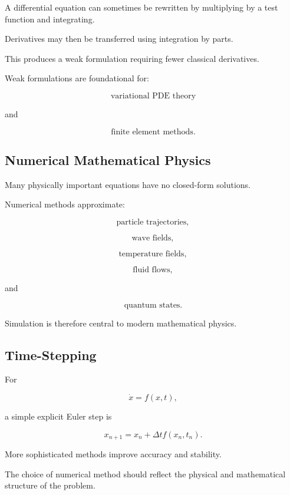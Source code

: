 A differential equation can sometimes be rewritten by multiplying by a test
function and integrating.

Derivatives may then be transferred using integration by parts.

This produces a weak formulation requiring fewer classical derivatives.

Weak formulations are foundational for:

\[
\boxed{
\text{variational PDE theory}
}
\]

and

\[
\boxed{
\text{finite element methods}.
}
\]

\subsection{Numerical Mathematical Physics}
\label{subsec:numerical-mathematical-physics}

Many physically important equations have no closed-form solutions.

Numerical methods approximate:

\[
\boxed{
\text{particle trajectories},
}
\]

\[
\boxed{
\text{wave fields},
}
\]

\[
\boxed{
\text{temperature fields},
}
\]

\[
\boxed{
\text{fluid flows},
}
\]

and

\[
\boxed{
\text{quantum states}.
}
\]

Simulation is therefore central to modern mathematical physics.

\subsection{Time-Stepping}
\label{subsec:physical-time-stepping}

For

\[
\dot{x}=f(x,t),
\]

a simple explicit Euler step is

\[
\boxed{
x_{n+1}
=
x_n
+
\Delta t
f(x_n,t_n).
}
\]

More sophisticated methods improve accuracy and stability.

The choice of numerical method should reflect the physical and mathematical
structure of the problem.

